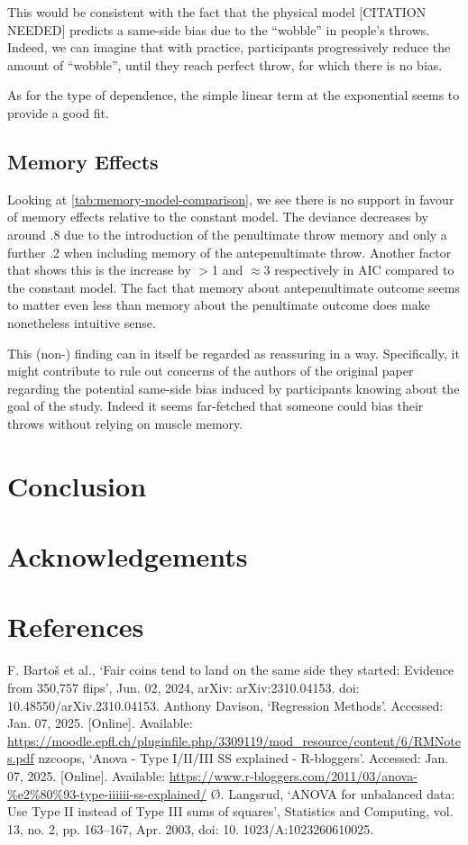 \documentclass[a4paper, 12pt,oneside]{article}
\begin{document}
			This would be consistent with the fact that the physical model [CITATION NEEDED] predicts a same-side bias due to the ``wobble'' in people's throws. Indeed, we can imagine that with practice, participants progressively reduce the amount of ``wobble'', until they reach perfect throw, for which there is no bias. 

			As for the type of dependence, the simple linear term at the exponential seems to provide a good fit.  
		\subsection{Memory Effects}
		Looking at \ref{tab:memory-model-comparison}, we see there is no support in favour of memory effects relative to the constant model. The deviance decreases by around .8 due to the introduction of the penultimate throw memory and only a further .2 when including memory of the antepenultimate throw. Another factor that shows this is the increase by $>$1 and $\approx 3$ respectively in AIC compared to the constant model.
		The fact that memory about antepenultimate outcome seems to matter even less than memory about the penultimate outcome does make nonetheless intuitive sense. 

		This (non-) finding can in itself be regarded as reassuring in a way. Specifically, it might contribute to rule out concerns of the authors of the original paper regarding the potential same-side bias induced by participants knowing about the goal of the study. Indeed it seems far-fetched that someone could bias their throws without relying on muscle memory. 
	\section{Conclusion}
	\section*{Acknowledgements}
	\section*{References}
		\noindent[1] F. Bartoš et al., `Fair coins tend to land on the same side they started: Evidence from 350,757 flips', Jun. 02, 2024, arXiv: arXiv:2310.04153. doi: 10.48550/arXiv.2310.04153.
		\newline[2] Anthony Davison, `Regression Methods'. Accessed: Jan. 07, 2025. [Online]. Available: \url{https://moodle.epfl.ch/pluginfile.php/3309119/mod_resource/content/6/RMNotes.pdf}
		\newline[3] nzcoops, `Anova - Type I/II/III SS explained - R-bloggers'. Accessed: Jan. 07, 2025. [Online]. Available: \newline\url{https://www.r-bloggers.com/2011/03/anova-\%e2\%80\%93-type-iiiiii-ss-explained/} 
		\newline[4] Ø. Langsrud, `ANOVA for unbalanced data: Use Type II instead of Type III sums of squares', Statistics and Computing, vol. 13, no. 2, pp. 163--167, Apr. 2003, doi: 10. 1023/A:1023260610025.
\end{document}
